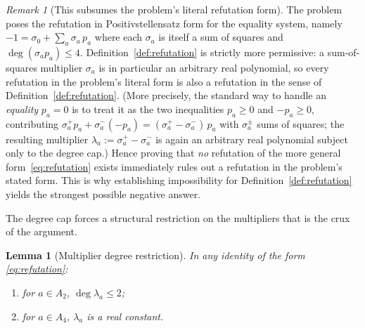 \documentclass{amsart}
\newtheorem{lemma}{Lemma}
\theoremstyle{definition}
\theoremstyle{remark}
\newtheorem{remark}{Remark}
\begin{document}
\begin{remark}[This subsumes the problem's literal refutation form]\label{rem:subsume}
The problem poses the refutation in Positivstellensatz form for the equality system, namely
$-1=\sigma_0+\sum_a \sigma_a\,p_a$ where each $\sigma_a$ is itself a sum of squares and
$\deg(\sigma_a p_a)\le4$. Definition~\ref{def:refutation} is strictly more permissive: a
sum-of-squares multiplier $\sigma_a$ is in particular an arbitrary real polynomial, so every
refutation in the problem's literal form is also a refutation in the sense of
Definition~\ref{def:refutation}. (More precisely, the standard way to handle an
\emph{equality} $p_a=0$ is to treat it as the two inequalities $p_a\ge0$ and $-p_a\ge0$,
contributing $\sigma_a^{+}p_a+\sigma_a^{-}(-p_a)=(\sigma_a^{+}-\sigma_a^{-})\,p_a$ with
$\sigma_a^{\pm}$ sums of squares; the resulting multiplier
$\lambda_a:=\sigma_a^{+}-\sigma_a^{-}$ is again an arbitrary real polynomial subject only to
the degree cap.) Hence proving that \emph{no} refutation of the more general
form~\eqref{eq:refutation} exists immediately rules out a refutation in the problem's stated
form. This is why establishing impossibility for Definition~\ref{def:refutation} yields the
strongest possible negative answer.
\end{remark}

The degree cap forces a structural restriction on the multipliers that is the crux of the
argument.

\begin{lemma}[Multiplier degree restriction]\label{lem:multdeg}
In any identity of the form \eqref{eq:refutation}:
\begin{enumerate}
\item for $a\in A_2$, $\deg\lambda_a\le 2$;
\item for $a\in A_4$, $\lambda_a$ is a real constant.
\end{enumerate}
\end{lemma}
\end{document}
